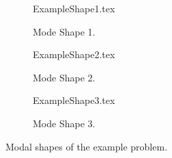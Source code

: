 \begin{figure}[h!]
	\def\cs{.3}	
\begin{subfigure}{\cs\textwidth}
	\centering
	\def\width{\linewidth}
	\def\height{\linewidth}
	{ExampleShape1.tex}
	\caption{Mode Shape 1.}
	\label{fig:ExampleShape1}
\end{subfigure}
\begin{subfigure}{\cs\textwidth}
	\centering
	\def\width{\linewidth+1em}
	\def\height{\linewidth}
	{ExampleShape2.tex}
	\caption{Mode Shape 2.}
	\label{fig:ExampleShape2}
\end{subfigure}
\begin{subfigure}{\cs\textwidth}
	\centering
	\def\width{\linewidth}
	\def\height{\linewidth}
	{ExampleShape3.tex}
	\caption{Mode Shape 3.}
	\label{fig:ExampleShape3}
\end{subfigure}
\caption{Modal shapes of the example problem.}\label{fig:ExampleShape}
\end{figure}
